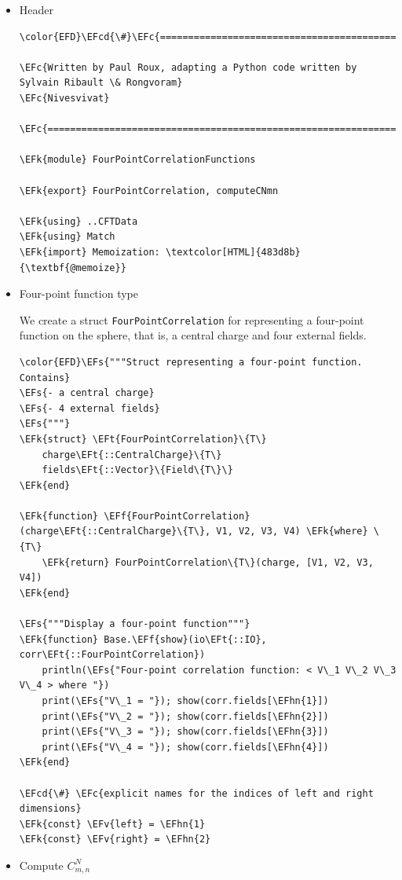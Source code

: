 \documentclass[a4paper]{article}
\numberwithin{equation}{section}
\newcommand{\EFc}[1]{\textcolor{EFc}{#1}} %
\newcommand{\EFcd}[1]{\textcolor{EFcd}{#1}} %
\newcommand{\EFs}[1]{\textcolor{EFs}{#1}} %
\newcommand{\EFk}[1]{\textcolor{EFk}{#1}} %
\newcommand{\EFf}[1]{\textcolor{EFf}{#1}} %
\newcommand{\EFv}[1]{\textcolor{EFv}{#1}} %
\newcommand{\EFt}[1]{\textcolor{EFt}{#1}} %
\newcommand{\EFhn}[1]{\textcolor{EFhn}{#1}} %
\begin{document}
\begin{itemize}
\item Header
\label{sec:org8f1787b}

\begin{Code}
\begin{Verbatim}
\color{EFD}\EFcd{\#}\EFc{===========================================================================================}

\EFc{Written by Paul Roux, adapting a Python code written by Sylvain Ribault \& Rongvoram}
\EFc{Nivesvivat}

\EFc{===========================================================================================\#}

\EFk{module} FourPointCorrelationFunctions

\EFk{export} FourPointCorrelation, computeCNmn

\EFk{using} ..CFTData
\EFk{using} Match
\EFk{import} Memoization: \textcolor[HTML]{483d8b}{\textbf{@memoize}}
\end{Verbatim}
\end{Code}
\item Four-point function type
\label{sec:org4d2078b}

We create a struct \texttt{FourPointCorrelation} for representing a four-point function on the sphere, that is, a central charge and four external fields.

\begin{Code}
\begin{Verbatim}
\color{EFD}\EFs{"""Struct representing a four-point function. Contains}
\EFs{- a central charge}
\EFs{- 4 external fields}
\EFs{"""}
\EFk{struct} \EFt{FourPointCorrelation}\{T\}
    charge\EFt{::CentralCharge}\{T\}
    fields\EFt{::Vector}\{Field\{T\}\}
\EFk{end}

\EFk{function} \EFf{FourPointCorrelation}(charge\EFt{::CentralCharge}\{T\}, V1, V2, V3, V4) \EFk{where} \{T\}
    \EFk{return} FourPointCorrelation\{T\}(charge, [V1, V2, V3, V4])
\EFk{end}

\EFs{"""Display a four-point function"""}
\EFk{function} Base.\EFf{show}(io\EFt{::IO}, corr\EFt{::FourPointCorrelation})
    println(\EFs{"Four-point correlation function: < V\_1 V\_2 V\_3 V\_4 > where "})
    print(\EFs{"V\_1 = "}); show(corr.fields[\EFhn{1}])
    print(\EFs{"V\_2 = "}); show(corr.fields[\EFhn{2}])
    print(\EFs{"V\_3 = "}); show(corr.fields[\EFhn{3}])
    print(\EFs{"V\_4 = "}); show(corr.fields[\EFhn{4}])
\EFk{end}

\EFcd{\#} \EFc{explicit names for the indices of left and right dimensions}
\EFk{const} \EFv{left} = \EFhn{1}
\EFk{const} \EFv{right} = \EFhn{2}
\end{Verbatim}
\end{Code}
\item Compute \(C^N_{m,n}\)
\label{sec:orga71ddf8}


\end{itemize}
\end{document}

